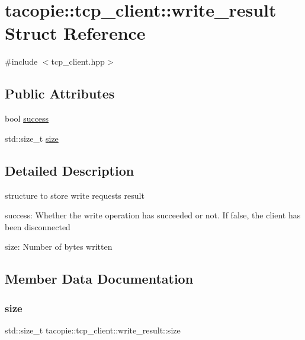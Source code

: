 \hypertarget{structtacopie_1_1tcp__client_1_1write__result}{}\section{tacopie\+:\+:tcp\+\_\+client\+:\+:write\+\_\+result Struct Reference}
\label{structtacopie_1_1tcp__client_1_1write__result}


{\ttfamily \#include $<$tcp\+\_\+client.\+hpp$>$}

\subsection*{Public Attributes}
\begin{DoxyCompactItemize}
\item 
bool \hyperlink{structtacopie_1_1tcp__client_1_1write__result_a4a8d5706c83068a97c10e63c6080e6a3}{success}
\item 
std\+::size\+\_\+t \hyperlink{structtacopie_1_1tcp__client_1_1write__result_acee9eca954a6f1b6283c6188eead2ab1}{size}
\end{DoxyCompactItemize}


\subsection{Detailed Description}
structure to store write requests result
\begin{DoxyItemize}
\item success\+: Whether the write operation has succeeded or not. If false, the client has been disconnected
\item size\+: Number of bytes written 
\end{DoxyItemize}

\subsection{Member Data Documentation}
\mbox{\label{structtacopie_1_1tcp__client_1_1write__result_acee9eca954a6f1b6283c6188eead2ab1}} 
\subsubsection{\texorpdfstring{size}{size}}
{\footnotesize\ttfamily std\+::size\+\_\+t tacopie\+::tcp\+\_\+client\+::write\+\_\+result\+::size}

